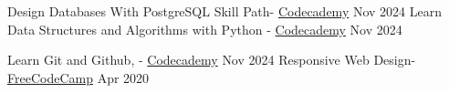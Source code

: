 
\begin{cvskills}
    \cvskill
    { {Design Databases With PostgreSQL Skill Path}-  \href{https://www.codecademy.com/enrolled/paths/design-databases-with-postgresql}{\color{blue}Codecademy}} %
    {Nov 2024} %
  \cvskill
    { {Learn Data Structures and Algorithms with Python} \textit{}- \href{https://www.codecademy.com/learn/learn-data-structures-and-algorithms-with-python}{\color{blue}Codecademy}} %
    {Nov 2024} %

  \cvskill
    { {Learn Git and Github}, \textit{}- \href{https://www.codecademy.com/enrolled/courses/learn-git}{\color{blue}Codecademy}} %
    {Nov 2024} %
  \cvskill
    { {Responsive Web Design}-  \href{https://www.freecodecamp.org/fcce5fcfa09-1a62-4f93-ab40-cdc329e7d433}{\color{blue}FreeCodeCamp}} %
    {Apr 2020} %

\end{cvskills}
